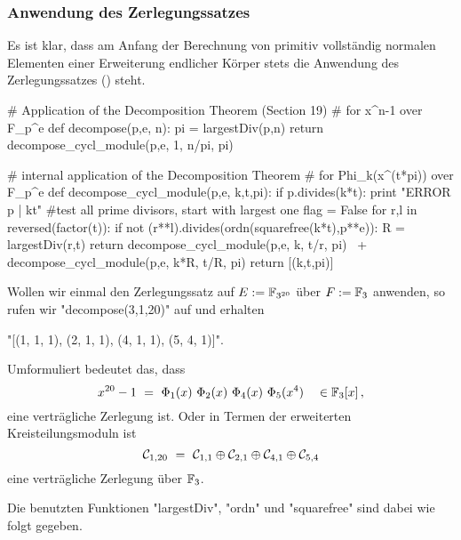 \subsubsection{Anwendung des Zerlegungssatzes}
Es ist klar, dass am Anfang der Berechnung von primitiv vollständig normalen
Elementen einer Erweiterung endlicher Körper stets die Anwendung des
Zerlegungssatzes () steht.


\begin{sagecode}[caption={[\texttt{decompose} aus 
 \url{../Sage/enumeratePCNs.spyx}]Aus \url{../Sage/enumeratePCNs.spyx}},
  label=lst:decompose]
# Application of the Decomposition Theorem (Section 19)
# for x^n-1 over F_p^e
def decompose(p,e, n):
    pi = largestDiv(p,n)
    return decompose_cycl_module(p,e, 1, n/pi, pi)
\end{sagecode}


\begin{sagecode}[caption={[\texttt{decompose\_cycl\_module} aus 
 \url{../Sage/enumeratePCNs.spyx}]Aus \url{../Sage/enumeratePCNs.spyx}},
  label=lst:decompose_cycl_module]
# internal application of the Decomposition Theorem
# for Phi_k(x^(t*pi)) over F_p^e
def decompose_cycl_module(p,e, k,t,pi):
    if p.divides(k*t): print "ERROR p | kt"
    #test all prime divisors, start with largest one
    flag = False
    for r,l in reversed(factor(t)):
        if not (r**l).divides(ordn(squarefree(k*t),p**e)):
            R = largestDiv(r,t)
            return decompose_cycl_module(p,e, k, t/r, pi) \
                    + decompose_cycl_module(p,e, k*R, t/R, pi)
    return [(k,t,pi)]
\end{sagecode}

\begin{beispiel}
  Wollen wir einmal den Zerlegungssatz auf $E := \mathbb{F}_{3^{20}}$ über 
  $F := \mathbb{F}_3$ anwenden, so rufen wir "decompose(3,1,20)" auf und 
  erhalten
  \begin{center}
    "[(1, 1, 1), (2, 1, 1), (4, 1, 1), (5, 4, 1)]".
  \end{center}
  Umformuliert bedeutet das, dass
  \[ x^{20} - 1 \ =\  \Phi_1(x)\ \Phi_2(x)\ \Phi_4(x)\ \Phi_5(x^4)\quad
    \in \mathbb{F}_3[x]\,,\]
  eine verträgliche Zerlegung ist. 
  Oder in Termen der erweiterten Kreisteilungsmoduln ist 
  \[ \mathcal{C}_{1,20} \ =\  \mathcal{C}_{1,1} \oplus \mathcal{C}_{2,1} \oplus
    \mathcal{C}_{4,1} \oplus \mathcal{C}_{5,4}\]
  eine verträgliche Zerlegung über $\mathbb{F}_3$.
\end{beispiel}

Die benutzten Funktionen "largestDiv", "ordn" und "squarefree" sind dabei 
wie folgt gegeben.

